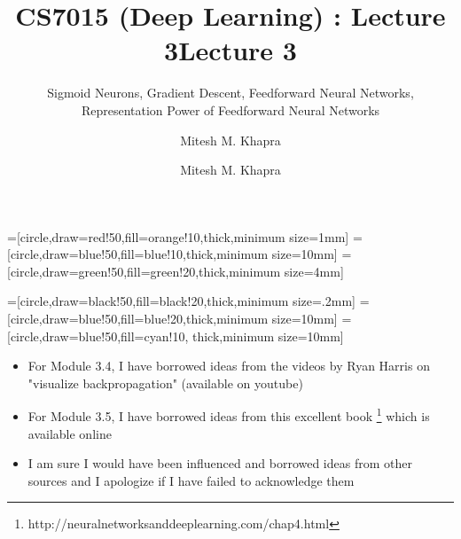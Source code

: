 \documentclass[serif, aspectratio=169]{beamer}
\author{Mitesh M. Khapra}
\title{CS7015 (Deep Learning) : Lecture 3}
\subtitle{Sigmoid Neurons, Gradient Descent, Feedforward Neural Networks, Representation Power of Feedforward Neural Networks}
\institute{Department of Computer Science and Engineering\\ Indian Institute of Technology Madras}
\date{}
\begin{document}
\renewcommand{\thefootnote}{$\star$}


\newcommand\derivative[5]{%
	\tkzDefPointByFct[draw](#1) \tkzGetPoint{start}
	\tkzDefPointByFct[draw](#2) \tkzGetPoint{end}
	\draw[thin,|-|,yshift=-3pt] (start) -- node[black,fill=white,#5] {#3}(start-|end);
	\draw[thin,|-|,xshift=3pt] (start-|end) -- node[black,fill=white,right] {#4}(end);
}

\title{Lecture 3}
\author{Mitesh M. Khapra}
\maketitle


=[circle,draw=red!50,fill=orange!10,thick,minimum size=1mm]
=[circle,draw=blue!50,fill=blue!10,thick,minimum size=10mm]
=[circle,draw=green!50,fill=green!20,thick,minimum size=4mm]

=[circle,draw=black!50,fill=black!20,thick,minimum size=.2mm]
=[circle,draw=blue!50,fill=blue!20,thick,minimum size=10mm]
=[circle,draw=blue!50,fill=cyan!10, thick,minimum size=10mm]


\begin{frame}
\begin{itemize}
  \item For Module 3.4, I have borrowed ideas from the videos by Ryan Harris on "visualize backpropagation" (available on youtube)
  \item For Module 3.5, I have borrowed ideas from this excellent book \footnote{http://neuralnetworksanddeeplearning.com/chap4.html} which is available online
  \item I am sure I would have been influenced and borrowed ideas from other sources and I apologize if I have failed to acknowledge them
\end{itemize}
\end{frame}





\end{document}
